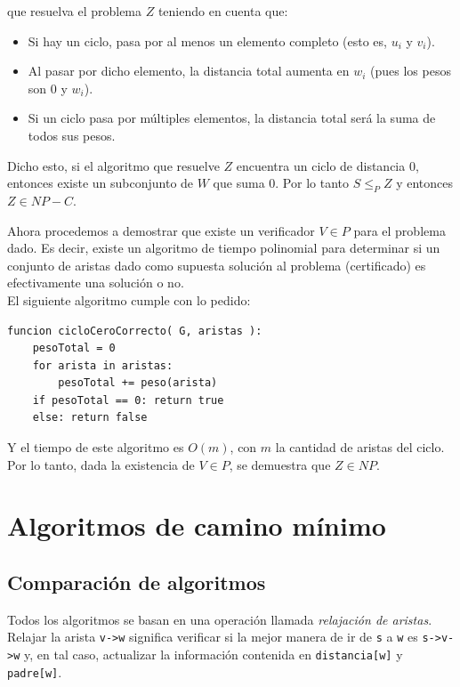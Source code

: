 \documentclass{article}
\def\code#1{\texttt{#1}}
\newcommand\tab[1][0.5cm]{\hspace*{#1}}
\begin{document}
\begin{enumerate}
                que resuelva el problema $Z$ teniendo en cuenta que:
                \begin{itemize}
                    \item Si hay un ciclo, pasa por al menos un elemento completo (esto es, $u_{i}$ y $v_{i}$).
                    \item Al pasar por dicho elemento, la distancia total aumenta en $w_{i}$ (pues los pesos son $0$
                    y $w_{i}$).
                    \item Si un ciclo pasa por múltiples elementos, la distancia total será la suma de todos sus pesos.
                \end{itemize}
            \tab\tab Dicho esto, si el algoritmo que resuelve $Z$ encuentra un ciclo de distancia $0$, entonces existe
            un subconjunto de $W$ que suma $0$. Por lo tanto $S \leq_{P} Z$ y entonces $Z \in NP-C$.

            \tab Ahora procedemos a demostrar que existe un verificador $V \in P$ para el problema dado. Es decir,
            existe un algoritmo de tiempo polinomial para determinar si un conjunto de aristas dado como supuesta
            solución al problema (certificado) es efectivamente una solución o no. \\
            \tab El siguiente algoritmo cumple con lo pedido:

            \begin{lstlisting}
funcion cicloCeroCorrecto( G, aristas ):
    pesoTotal = 0
    for arista in aristas:
        pesoTotal += peso(arista)
    if pesoTotal == 0: return true
    else: return false
            \end{lstlisting}

            \tab Y el tiempo de este algoritmo es $O(m)$, con $m$ la cantidad de aristas del ciclo. Por lo tanto,
            dada la existencia de $V \in P$, se demuestra que $Z \in NP$.
    \end{enumerate}

    \newpage

    \section{Algoritmos de camino mínimo}
        \subsection{Comparación de algoritmos}
            \tab Todos los algoritmos se basan en una operación llamada \emph{relajación de aristas}. Relajar
        la arista \code{v->w} significa verificar si la mejor manera de ir de \code{s} a \code{w} es \code{s->v->w}
        y, en tal caso, actualizar la información contenida en \code{distancia[w]} y \code{padre[w]}.
\end{document}
